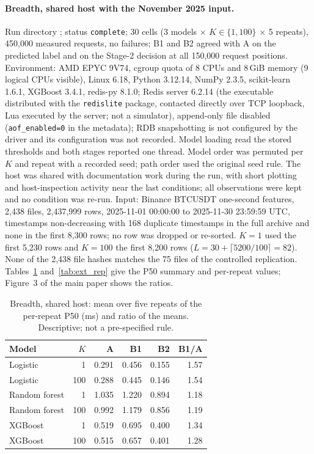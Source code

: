\documentclass[10pt,a4paper]{article}
\begin{document}
\paragraph{Breadth, shared host with the November 2025 input.} Run directory ; status \texttt{complete}; 30 cells (3 models $\times$ $K\in\{1,100\}$ $\times$ 5 repeats), 450,000 measured requests, no failures; B1 and B2 agreed with A on the predicted label and on the Stage-2 decision at all 150,000 request positions. Environment: AMD EPYC 9V74, cgroup quota of 8 CPUs and 8\,GiB memory (9 logical CPUs visible), Linux 6.18, Python 3.12.14, NumPy 2.3.5, scikit-learn 1.6.1, XGBoost 3.4.1, redis-py 8.1.0; Redis server 6.2.14 (the executable distributed with the \texttt{redislite} package, contacted directly over TCP loopback, Lua executed by the server; not a simulator), append-only file disabled (\texttt{aof\_enabled=0} in the metadata); RDB snapshotting is not configured by the driver and its configuration was not recorded. Model loading read the stored thresholds and both stages reported one thread. Model order was permuted per $K$ and repeat with a recorded seed; path order used the original seed rule. The host was shared with documentation work during the run, with short plotting and host-inspection activity near the last conditions; all observations were kept and no condition was re-run. Input: Binance BTCUSDT one-second features, 2,438 files, 2,437,999 rows, 2025-11-01 00:00:00 to 2025-11-30 23:59:59 UTC, timestamps non-decreasing with 168 duplicate timestamps in the full archive and none in the first 8,300 rows; no row was dropped or re-sorted. $K=1$ used the first 5,230 rows and $K=100$ the first 8,200 rows ($L=30+\lceil5200/100\rceil=82$). None of the 2,438 file hashes matches the 75 files of the controlled replication. Tables~\ref{tab:ext_p50} and~\ref{tab:ext_rep} give the P50 summary and per-repeat values; Figure~3 of the main paper shows the ratios.

\begin{table}[h]
\centering\small
\caption{Breadth, shared host: mean over five repeats of the per-repeat P50 (ms) and ratio of the means. Descriptive; not a pre-specified rule.}\label{tab:ext_p50}
\begin{tabular}{lrrrrr}
\toprule
Model & $K$ & A & B1 & B2 & B1/A \\
\midrule
Logistic & 1 & 0.291 & 0.456 & 0.155 & 1.57 \\
Logistic & 100 & 0.288 & 0.445 & 0.146 & 1.54 \\
Random forest & 1 & 1.035 & 1.220 & 0.894 & 1.18 \\
Random forest & 100 & 0.992 & 1.179 & 0.856 & 1.19 \\
XGBoost & 1 & 0.519 & 0.695 & 0.400 & 1.34 \\
XGBoost & 100 & 0.515 & 0.657 & 0.401 & 1.28 \\
\bottomrule
\end{tabular}
\end{table}
\end{document}
